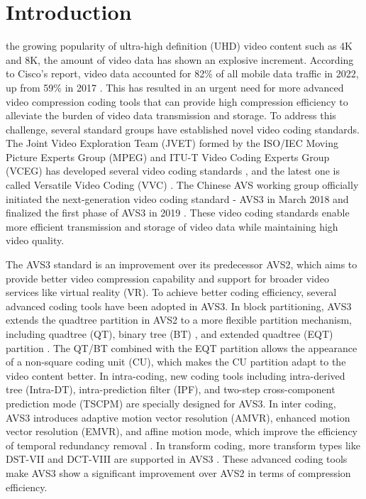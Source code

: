 \documentclass[lettersize,journal]{IEEEtran}
\begin{document}
\section{Introduction}
\label{sec:1}
 the growing popularity of ultra-high definition (UHD) video content such as 4K and 8K, the amount of video data has shown an explosive increment. According to Cisco's report, video data accounted for 82\% of all mobile data traffic in 2022, up from 59\% in 2017 \cite{barnett2018cisco}. This has resulted in an urgent need for more advanced video compression coding tools that can provide high compression efficiency to alleviate the burden of video data transmission and storage. To address this challenge, several standard groups have established novel video coding standards. The Joint Video Exploration Team (JVET) formed by the ISO/IEC Moving Picture Experts Group (MPEG) and ITU-T Video Coding Experts Group (VCEG) has developed several video coding standards \cite{1994H.262/MPEG-2, avcoverview, sullivan2012hevcoverview}, and the latest one is called Versatile Video Coding (VVC) \cite{bross2021vvcoverview}. The Chinese AVS working group officially initiated the next-generation video coding standard - AVS3 in March 2018 and finalized the first phase of AVS3 in 2019 \cite{zhang2019avs3overview}. These video coding standards enable more efficient transmission and storage of video data while maintaining high video quality. 

The AVS3 standard is an improvement over its predecessor AVS2, which aims to provide better video compression capability and support for broader video services like virtual reality (VR). To achieve better coding efficiency, several advanced coding tools have been adopted in AVS3. In block partitioning, AVS3 extends the quadtree partition in AVS2 to a more flexible partition mechanism, including quadtree (QT), binary tree (BT) \cite{huang2019vvcbt}, and extended quadtree (EQT) partition \cite{wang2019extendedpartition}. The QT/BT combined with the EQT partition allows the appearance of a non-square coding unit (CU), which makes the CU partition adapt to the video content better. In intra-coding, new coding tools including intra-derived tree (Intra-DT), intra-prediction filter (IPF), and two-step cross-component prediction mode (TSCPM) are specially designed for AVS3. In inter coding, AVS3 introduces adaptive motion vector resolution (AMVR), enhanced motion vector resolution (EMVR), and affine motion mode, which improve the efficiency of temporal redundancy removal \cite{fan2020avs3codingtools}. In transform coding, more transform types like DST-VII and DCT-VIII are supported in AVS3 \cite{avs3standard}. These advanced coding tools make AVS3 show a significant improvement over AVS2 in terms of compression efficiency. 
\end{document}
